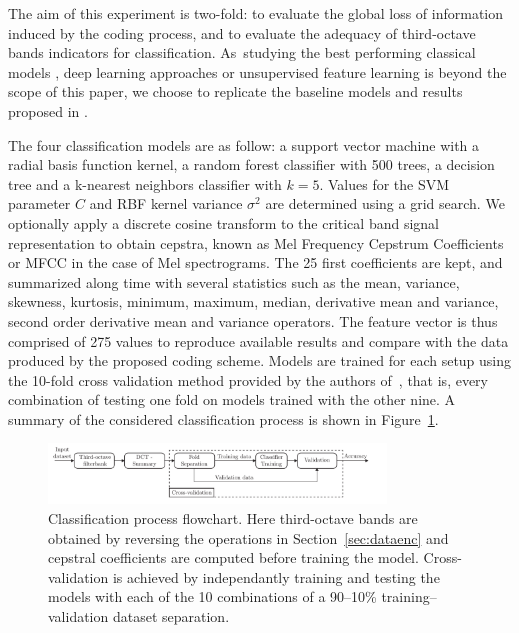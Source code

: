 \documentclass[sensors,article,accept,moreauthors,pdftex,10pt,a4paper]{mdpi}
\begin{document}
The aim of this experiment is two-fold: to evaluate the global loss of information induced by the coding process, and to evaluate the adequacy of third-octave bands indicators for classification. As~studying the best performing classical {models} \citep{ntalampiras2013}, %
deep learning approaches \citep{salamon2017} or unsupervised feature learning is beyond the scope of this paper, we choose to replicate the baseline models and results proposed in \cite{salamon2014}.

The four classification models are as follow: a support vector machine with a radial basis function kernel, a random forest classifier with 500 trees, a decision tree and a k-nearest neighbors classifier with $k = 5$. Values for the SVM parameter $C$ and RBF kernel variance $\sigma^2$ are determined using a grid search. We optionally apply a discrete cosine transform to the critical band signal representation to obtain cepstra, known as Mel Frequency Cepstrum Coefficients or MFCC in the case of Mel spectrograms. The 25 first coefficients are kept, and summarized along time with several statistics such as the mean, variance, skewness, kurtosis, minimum, maximum, median, derivative mean and variance, second order derivative mean and variance operators. The feature vector is thus comprised of 275 values to reproduce available results and compare with the data produced by the proposed coding scheme. Models are trained for each setup using the 10-fold cross validation method provided by the authors \mbox{of \cite{salamon2014},} that is, every combination of testing one fold on models trained with the other nine. A summary of the considered classification process is shown in Figure~\ref{fig:class_flwc}.

\begin{figure}[H]
	\centering
		\includegraphics[width=0.8\textwidth]{figures/class.pdf}
	\caption{Classification process flowchart. Here third-octave bands are obtained by reversing the operations in Section~\ref{sec:dataenc} and cepstral coefficients are computed before training the model. Cross-validation is achieved by independantly training and testing the models with each of the 10 combinations of a 90--{10}\% training{--}validation dataset separation.}%
	\label{fig:class_flwc}
\end{figure}
\end{document}

